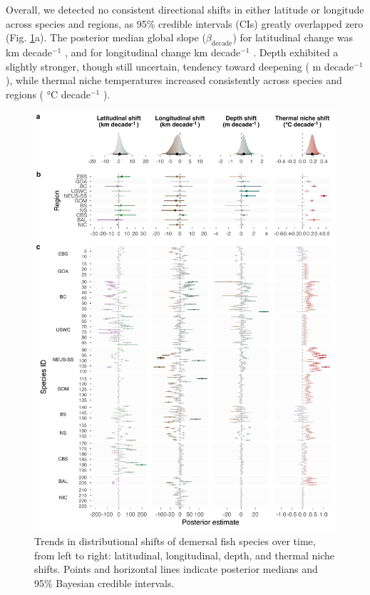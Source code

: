\documentclass[lineno,pdflatex,sn-nature]{sn-jnl}%
\begin{document}
Overall, we detected no consistent directional shifts in either latitude or longitude across species and regions, as 95\% credible intervals (CIs) greatly overlapped zero (Fig. \ref{fig:posterior_slopes}a). The posterior median global slope ($\beta_{\text{decade}}$) for latitudinal change was \LatMedian{} km decade$^{-1}$ \LatCI{}, and for longitudinal change \LonMedian{} km decade$^{-1}$ \LonCI{}. Depth exhibited a slightly stronger, though still uncertain, tendency toward deepening (\DepthMedian{} m decade$^{-1}$ \DepthCI{}), while thermal niche temperatures increased consistently across species and regions (\ThermalMedian{} °C decade$^{-1}$ \ThermalCI{}).

\begin{figure}[h]
\centering
\includegraphics[width=1\textwidth]{output/figures/main/posterior_slopes.png}
\caption{\label{fig:posterior_slopes}Trends in distributional shifts of demersal fish species over time, from left to right: latitudinal, longitudinal, depth, and thermal niche shifts. Points and horizontal lines indicate posterior medians and 95\% Bayesian credible intervals.  
}
\end{figure}
\end{document}
